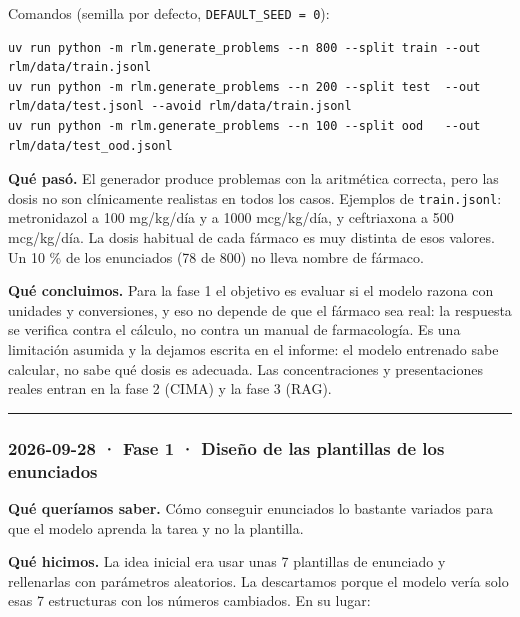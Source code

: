 Comandos (semilla por defecto, \texttt{DEFAULT\_\allowbreak{}SEED =\allowbreak{} 0}):

\begin{lstlisting}
uv run python -m rlm.generate_problems --n 800 --split train --out rlm/data/train.jsonl
uv run python -m rlm.generate_problems --n 200 --split test  --out rlm/data/test.jsonl --avoid rlm/data/train.jsonl
uv run python -m rlm.generate_problems --n 100 --split ood   --out rlm/data/test_ood.jsonl
\end{lstlisting}

\textbf{Qué pasó.} El generador produce problemas con la aritmética correcta, pero las dosis no son
clínicamente realistas en todos los casos. Ejemplos de \texttt{train.jsonl}: metronidazol a
100 mg/kg/día y a 1000 mcg/kg/día, y ceftriaxona a 500 mcg/kg/día. La dosis habitual de cada
fármaco es muy distinta de esos valores. Un 10 \% de los enunciados (78 de 800) no lleva nombre
de fármaco.

\textbf{Qué concluimos.} Para la fase 1 el objetivo es evaluar si el modelo razona con unidades y
conversiones, y eso no depende de que el fármaco sea real: la respuesta se verifica contra el
cálculo, no contra un manual de farmacología. Es una limitación asumida y la dejamos escrita en el
informe: el modelo entrenado sabe calcular, no sabe qué dosis es adecuada. Las concentraciones y
presentaciones reales entran en la fase 2 (CIMA) y la fase 3 (RAG).

\begin{center}\rule{0.5\linewidth}{0.5pt}\end{center}

\subsubsection{2026-09-28 · Fase 1 · Diseño de las plantillas de los enunciados}

\textbf{Qué queríamos saber.} Cómo conseguir enunciados lo bastante variados para que el modelo
aprenda la tarea y no la plantilla.

\textbf{Qué hicimos.} La idea inicial era usar unas 7 plantillas de enunciado y rellenarlas con
parámetros aleatorios. La descartamos porque el modelo vería solo esas 7 estructuras con los
números cambiados. En su lugar:

